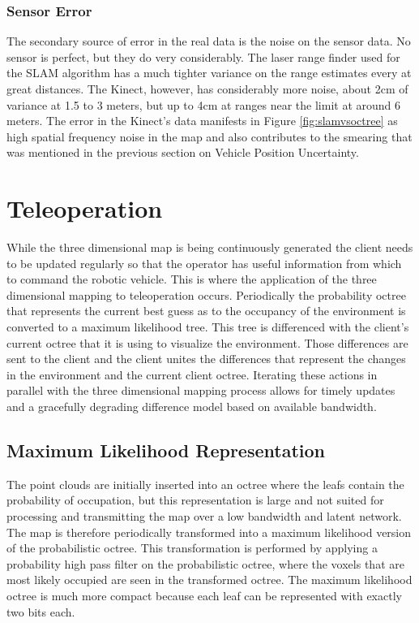 \documentclass[journal]{IEEEtran}
\begin{document}
  \subsubsection{Sensor Error}
  The secondary source of error in the real data is the noise on the sensor
  data. No sensor is perfect, but they do very considerably. The laser range
  finder used for the SLAM algorithm has a much tighter variance on the range
  estimates every at great distances. The Kinect, however, has considerably
  more noise, about 2cm of variance at 1.5 to 3 meters, but up to 4cm at
  ranges near the limit at around 6 meters.\cite{khoshelham2011accuracy} The
  error in the Kinect's data manifests in Figure \ref{fig:slamvsoctree} as
  high spatial frequency noise in the map and also contributes to the smearing
  that was mentioned in the previous section on Vehicle Position Uncertainty.
  
  \section{Teleoperation}
  While the three dimensional map is being continuously generated the client
  needs to be updated regularly so that the operator has useful information
  from which to command the robotic vehicle. This is where the application of
  the three dimensional mapping to teleoperation occurs. Periodically the
  probability octree that represents the current best guess as to the
  occupancy of the environment is converted to a maximum likelihood tree. This
  tree is differenced with the client's current octree that it is using to
  visualize the environment. Those differences are sent to the client and the
  client unites the differences that represent the changes in the environment
  and the current client octree. Iterating these actions in parallel with the
  three dimensional mapping process allows for timely updates and a gracefully
  degrading difference model based on available bandwidth.
  
  \subsection{Maximum Likelihood Representation}
  The point clouds are initially inserted into an octree where the leafs
  contain the probability of occupation, but this representation is large and
  not suited for processing and transmitting the map over a low bandwidth and
  latent network. The map is therefore periodically transformed into a maximum
  likelihood version of the probabilistic octree. This transformation is
  performed by applying a probability high pass filter on the probabilistic
  octree, where the voxels that are most likely occupied are seen in the
  transformed octree. The maximum likelihood octree is much more compact
  because each leaf can be represented with exactly two bits
  each.\cite{octomap}
  
\end{document}
